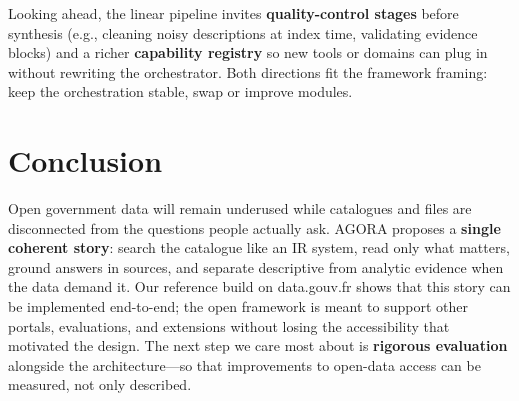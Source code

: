 \documentclass[sigconf,anonymous]{acmart}
\begin{document}
Looking ahead, the linear pipeline invites \textbf{quality-control stages} before synthesis (e.g., cleaning noisy descriptions at index time, validating evidence blocks) and a richer \textbf{capability registry} so new tools or domains can plug in without rewriting the orchestrator. Both directions fit the framework framing: keep the orchestration stable, swap or improve modules.

\section{Conclusion}
\label{sec:conclusion}

Open government data will remain underused while catalogues and files are disconnected from the questions people actually ask. AGORA proposes a \textbf{single coherent story}: search the catalogue like an IR system, read only what matters, ground answers in sources, and separate descriptive from analytic evidence when the data demand it. Our reference build on data.gouv.fr shows that this story can be implemented end-to-end; the open framework is meant to support other portals, evaluations, and extensions without losing the accessibility that motivated the design. The next step we care most about is \textbf{rigorous evaluation} alongside the architecture---so that improvements to open-data access can be measured, not only described.

\balance


\end{document}
